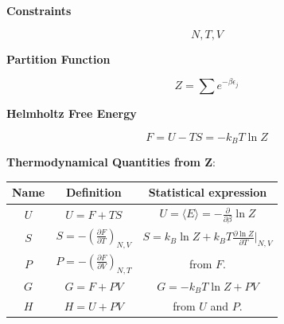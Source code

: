 \documentclass{article}
\begin{document}
\begin{tcolorbox}[colframe=gray!90, colback=gray!5, coltitle=white, sharp corners, title=\textbf{Canonical Ensamble, Summary}, fonttitle=\large\bfseries]

    \textbf{Constraints}

    \begin{equation}
        N, T, V
    \end{equation}

    \textbf{Partition Function}

    \begin{equation}
        Z = \sum e^{-\beta \epsilon_j}
    \end{equation}

    \textbf{Helmholtz Free Energy}

    \begin{equation}
        F = U - TS= -k_BT \ln{Z}
    \end{equation}

    \vspace{0.3cm} %
    \textbf{Thermodynamical Quantities from Z}:

    \begin{center}
        \begin{tabular}{|c|c|c|}
            \hline
            \textbf{Name} & \textbf{Definition}                                           & \textbf{Statistical expression}                                           \\ \hline
            \( U \)       & \( U = F + TS \)                                              & \( U = \langle E \rangle = -\frac{\partial}{\partial \beta} \ln Z \)      \\ \hline
            \( S \)       & \( S = -\left( \frac{\partial F}{\partial T} \right)_{N,V} \) & \( S = k_B \ln Z + k_B T \frac{\partial \ln Z}{\partial T} \Big|_{N,V} \) \\ \hline
            \( P \)       & \( P = -\left( \frac{\partial F}{\partial V} \right)_{N,T} \) & from \( F \).                                                             \\ \hline
            \( G \)       & \( G = F + PV \)                                              & \( G = -k_B T \ln Z + PV \)                                               \\ \hline
            \( H \)       & \( H = U + PV \)                                              & from \( U \) and \( P \).                                                 \\ \hline
        \end{tabular}
    \end{center}

\end{tcolorbox}
\end{document}
